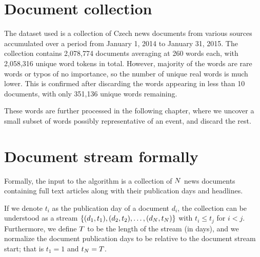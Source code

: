 \section{Document collection}
The dataset used is a collection of Czech news documents from various sources accumulated over a period from January 1, 2014 to January 31, 2015. The collection contains 2,078,774 documents averaging at 260 words each, with 2,058,316 unique word tokens in total. However, majority of the words are rare words or typos of no importance, so the number of unique real words is much lower. This is confirmed after discarding the words appearing in less than 10 documents, with only 351,136 unique words remaining.

These words are further processed in the following chapter, where we uncover a small subset of words possibly representative of an event, and discard the rest.


\section{Document stream formally}
Formally, the input to the algorithm is a collection of $N$ news documents containing full text articles along with their publication days and headlines.

If we denote $t_{i}$ as the publication day of a document $d_{i}$, the collection can be understood as a stream $\left\{ (d_{1}, t_{1}), (d_{2}, t_{2}), \dots, (d_{N}, t_{N}) \right\}$ with $t_{i} \leq t_{j}$ for $i < j$. Furthermore, we define $T$ to be the length of the stream (in days), and we normalize the document publication days to be relative to the document stream start; that is $t_{1} = 1$ and $t_{N} = T$.